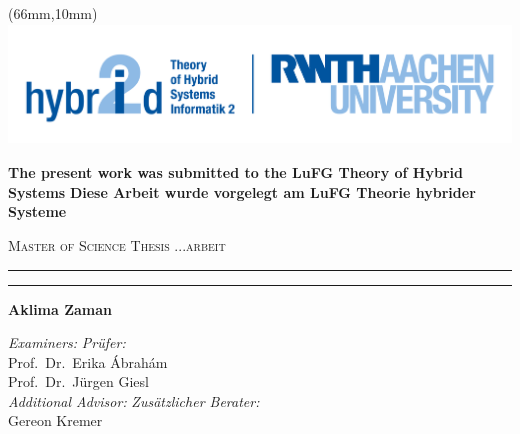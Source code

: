 

\begin{titlepage}

\begin{center}



	\begin{textblock*}{1mm}(66mm,10mm)%
		\includegraphics[height=32mm]{./logo_ths.png}
	\end{textblock*}
	\fontsize{14pt}{16}\selectfont
	\ifenglish\noindent \textbf{The present work was submitted to the LuFG Theory of Hybrid Systems}
	\else\noindent\textbf{Diese Arbeit wurde vorgelegt am LuFG Theorie hybrider Systeme}\fi 

\medskip
\vspace*{2cm}

\ifenglish\textsc{\Large Master of Science Thesis}
\else\textsc{\Large ...arbeit}\fi \\[0.5cm]


\hrule \par\bigskip
{ \huge \begin{spacing}{1.1}  \end{spacing} }
\par\bigskip
\hrule \par\bigskip
\large{\textbf{Aklima Zaman} \\
}
\vfill \vfill \vfill \vfill
\begin{minipage}[b]{0.65\textwidth}
 \large
\ifenglish\emph{Examiners:}
\else\emph{Pr\"ufer:}\fi \\
Prof.~Dr.~Erika \'Abrah\'am \\
Prof.~Dr.~Jürgen Giesl \\

\ifenglish\emph{Additional Advisor:}
\else\emph{Zus\"atzlicher Berater:} \fi\\
Gereon Kremer\\



\end{minipage}
\end{center}
\end{titlepage}
